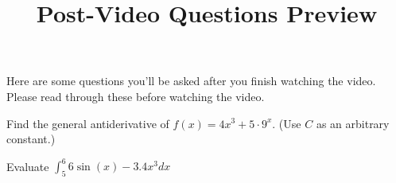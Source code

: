 \documentclass[handout]{ximera}
\title{Post-Video Questions Preview}
\begin{document}
\begin{abstract}
\end{abstract}


\maketitle

Here are some questions you’ll be asked after you finish watching the video. Please read through these before watching the video.

\begin{problem}
Find the general antiderivative of $f(x)=4x^3+5 \cdot 9^x$. (Use $C$ as an arbitrary constant.)
\end{problem}

\begin{problem}
Evaluate $\int_5^{6} 6 \sin(x) - 3.4x^{3} dx$
\end{problem}
\end{document}
